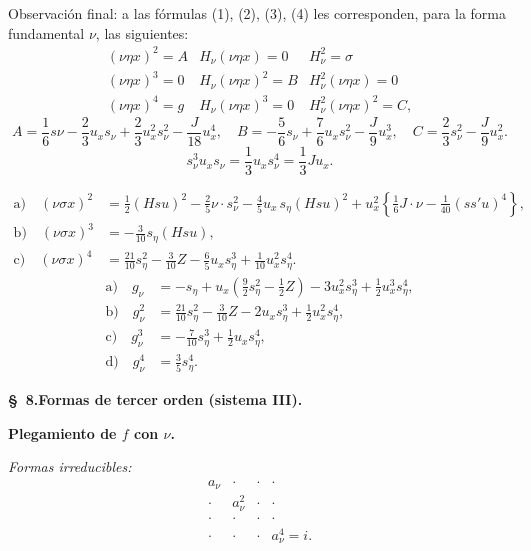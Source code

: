 \documentclass[11pt]{article}
\begin{document}
Observación final: a las fórmulas (1), (2), (3), (4) les corresponden, para la forma fundamental $\nu$, las siguientes:
\[
\tag{5}
\begin{array}{c|c|c}
(\nu\eta x)^2=A & H_\nu(\nu\eta x)=0 & H_\nu^2=\sigma\\[0.4em]
(\nu\eta x)^3=0 & H_\nu(\nu\eta x)^2=B & H_\nu^2(\nu\eta x)=0\\[0.4em]
(\nu\eta x)^4=g & H_\nu(\nu\eta x)^3=0 & H_\nu^2(\nu\eta x)^2=C,
\end{array}
\]
\[
A=\frac16s\nu-\frac23u_xs_\nu+\frac23u_x^2s_\nu^2-\frac{J}{18}u_x^4,
\quad B=-\frac56s_\nu+\frac76u_xs_\nu^2-\frac{J}{9}u_x^3,
\quad C=\frac23s_\nu^2-\frac{J}{9}u_x^2.
\]
\[
\tag{6}
s_\nu^3u_xs_\nu=\frac13u_xs_\nu^4=\frac13Ju_x.
\]

\[
\tag{7}
\begin{aligned}
\text{a)}\quad (\nu\sigma x)^2
&=\frac12(Hsu)^2-\frac25\nu\cdot s_\nu^2-
\frac45u_x\,s_\eta(Hsu)^2
+u_x^2\left\{\frac16J\cdot\nu-\frac1{40}(ss'u)^4\right\},\\
\text{b)}\quad (\nu\sigma x)^3&=-\frac3{10}s_\eta(Hsu),\\
\text{c)}\quad (\nu\sigma x)^4&=\frac{21}{10}s_\eta^2-\frac3{10}Z-
\frac65u_xs_\eta^3+\frac1{10}u_x^2s_\eta^4.
\end{aligned}
\]
\[
\tag{8}
\begin{aligned}
\text{a)}\quad g_\nu&=-s_\eta+u_x\left(\frac92s_\eta^2-\frac12Z\right)-3u_x^2s_\eta^3+\frac12u_x^3s_\eta^4,\\
\text{b)}\quad g_\nu^2&=\frac{21}{10}s_\eta^2-\frac3{10}Z-2u_xs_\eta^3+\frac12u_x^2s_\eta^4,\\
\text{c)}\quad g_\nu^3&=-\frac7{10}s_\eta^3+\frac12u_xs_\eta^4,\\
\text{d)}\quad g_\nu^4&=\frac35s_\eta^4.
\end{aligned}
\]

\begin{center}
\textbf{\S\ 8.\quad Formas de tercer orden (sistema III).}
\end{center}

\noindent\textbf{Plegamiento de $f$ con $\nu$.}

\noindent\emph{Formas irreducibles:}
\[
\begin{array}{cccc}
a_\nu&\cdot&\cdot&\cdot\\
\cdot&a_\nu^2&\cdot&\cdot\\
\cdot&\cdot&\cdot&\cdot\\
\cdot&\cdot&\cdot&a_\nu^4=i.
\end{array}
\]
\end{document}
